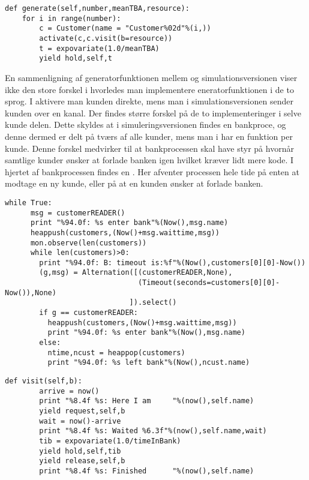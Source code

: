 \begin{lstlisting}[firstnumber=11, label=simpy_generator, caption=Generator funktion for simpy]
def generate(self,number,meanTBA,resource):         
    for i in range(number):
        c = Customer(name = "Customer%02d"%(i,))
        activate(c,c.visit(b=resource))              
        t = expovariate(1.0/meanTBA)               
        yield hold,self,t
\end{lstlisting}

En sammenligning af generatorfunktionen mellem \simpy og simulationsversionen viser ikke den store forskel i hvorledes  man  implementere eneratorfunktionen i de to sprog. I \simpy aktivere man kunden direkte, mens man i simulationsversionen sender kunden over en kanal. Der findes større forskel på de to implementeringer i selve kunde delen. Dette skyldes at i simuleringsversionen findes en bankproce, og denne dermed er delt på tværs af alle kunder, mens man i \simpy har en funktion per kunde. Denne forskel medvirker til at bankprocessen skal have styr på hvornår samtlige kunder ønsker at forlade banken igen hvilket kræver lidt mere kode. I hjertet af bankprocessen findes en . Her afventer processen hele tide på enten at modtage en ny kunde, eller på at en kunden ønsker at forlade banken.
\begin{lstlisting}[firstnumber=39,float=hbtp, label=fig:simulation_bank, caption= Uddrag af bank processen i simulation]
    while True:
      msg = customerREADER()
      print "%94.0f: %s enter bank"%(Now(),msg.name)
      heappush(customers,(Now()+msg.waittime,msg))
      mon.observe(len(customers))
      while len(customers)>0:
        print "%94.0f: B: timeout is:%f"%(Now(),customers[0][0]-Now())
        (g,msg) = Alternation([(customerREADER,None),
                               (Timeout(seconds=customers[0][0]- Now()),None)
                             ]).select()
        if g == customerREADER:
          heappush(customers,(Now()+msg.waittime,msg))
          print "%94.0f: %s enter bank"%(Now(),msg.name)
        else:
          ntime,ncust = heappop(customers)
          print "%94.0f: %s left bank"%(Now(),ncust.name) 
\end{lstlisting}
\begin{lstlisting}[firstnumber=20 ,float=hbtp, label=fig:simpy_customer, caption=funktionen \code{visit} i \simpy]
     def visit(self,b):                                
        arrive = now()
        print "%8.4f %s: Here I am     "%(now(),self.name)
        yield request,self,b                          
        wait = now()-arrive
        print "%8.4f %s: Waited %6.3f"%(now(),self.name,wait)
        tib = expovariate(1.0/timeInBank)            
        yield hold,self,tib                          
        yield release,self,b                         
        print "%8.4f %s: Finished      "%(now(),self.name)
\end{lstlisting}
